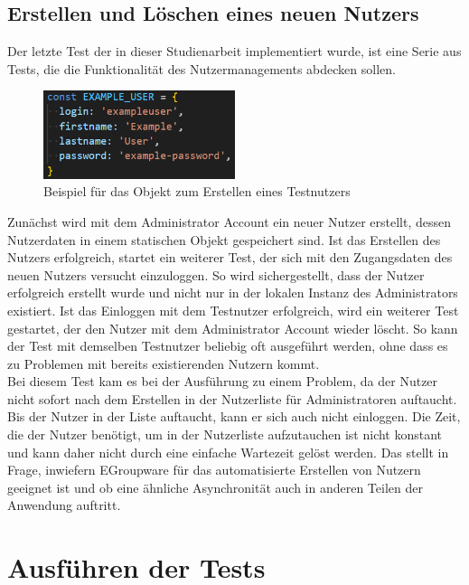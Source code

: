\subsection*{Erstellen und Löschen eines neuen Nutzers}

Der letzte Test der in dieser Studienarbeit implementiert wurde, ist eine Serie aus Tests, die die Funktionalität des Nutzermanagements abdecken sollen.
\begin{figure}[H]
    \centering
    \includegraphics[width=0.5\textwidth]{images/Exampleuser.png}
    \caption{Beispiel für das Objekt zum Erstellen eines Testnutzers}
    \label{fig:example-user}
\end{figure}
Zunächst wird mit dem Administrator Account ein neuer Nutzer erstellt, dessen Nutzerdaten in einem statischen Objekt gespeichert sind.
Ist das Erstellen des Nutzers erfolgreich, startet ein weiterer Test, der sich mit den Zugangsdaten des neuen Nutzers versucht einzuloggen.
So wird sichergestellt, dass der Nutzer erfolgreich erstellt wurde und nicht nur in der lokalen Instanz des Administrators existiert.
Ist das Einloggen mit dem Testnutzer erfolgreich, wird ein weiterer Test gestartet, der den Nutzer mit dem Administrator Account wieder löscht.
So kann der Test mit demselben Testnutzer beliebig oft ausgeführt werden, ohne dass es zu Problemen mit bereits existierenden Nutzern kommt.
\\
Bei diesem Test kam es bei der Ausführung zu einem Problem, da der Nutzer nicht sofort nach dem Erstellen in der Nutzerliste für Administratoren auftaucht.
Bis der Nutzer in der Liste auftaucht, kann er sich auch nicht einloggen.
Die Zeit, die der Nutzer benötigt, um in der Nutzerliste aufzutauchen ist nicht konstant und kann daher nicht durch eine einfache Wartezeit gelöst werden.
Das stellt in Frage, inwiefern EGroupware für das automatisierte Erstellen von Nutzern geeignet ist und ob eine ähnliche Asynchronität auch in anderen Teilen der Anwendung auftritt.


\section{Ausführen der Tests}
